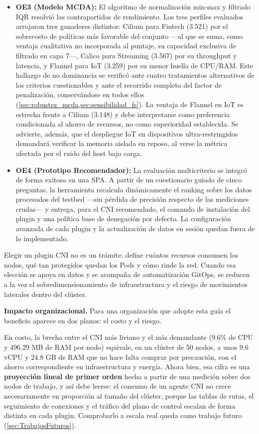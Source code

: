 \begin{itemize}
    \item \textbf{OE3 (Modelo MCDA):} El algoritmo de normalización min-max y filtrado IQR resolvió las contrapartidas de rendimiento. Los tres perfiles evaluados arrojaron tres ganadores distintos: Cilium para Fintech (3.521) por el sobrecosto de políticas más favorable del conjunto ---al que se suma, como ventaja cualitativa no incorporada al puntaje, su capacidad exclusiva de filtrado en capa 7---, Calico para Streaming (3.567) por su throughput y latencia, y Flannel para IoT (3.259) por su menor huella de CPU/RAM. Este hallazgo de no dominancia se verificó ante cuatro tratamientos alternativos de los criterios cuestionables y ante el recorrido completo del factor de penalización, conservándose en todos ellos (\cref{sec:robustez_mcda,sec:sensibilidad_fs}). La ventaja de Flannel en IoT es estrecha frente a Cilium (3.148) y debe interpretarse como preferencia condicionada al ahorro de recursos, no como superioridad establecida. Se advierte, además, que el despliegue IoT en dispositivos ultra-restringidos demandará verificar la memoria aislada en reposo, al verse la métrica afectada por el ruido del host bajo carga.
    
    \item \textbf{OE4 (Prototipo Recomendador):} La evaluación multicriterio se integró de forma exitosa en una SPA. A partir de un cuestionario guiado de cinco preguntas, la herramienta recalcula dinámicamente el ranking sobre los datos procesados del testbed ---sin pérdida de precisión respecto de las mediciones crudas--- y entrega, para el CNI recomendado, el comando de instalación del plugin y una política base de denegación por defecto. La configuración avanzada de cada plugin y la actualización de datos en sesión quedan fuera de lo implementado.
\end{itemize}

Elegir un plugin CNI no es un trámite: define cuántos recursos consumen los nodos, qué tan protegidos quedan los Pods y cómo rinde la red. Cuando esa elección se apoya en datos y se acompaña de automatización GitOps, se reducen a la vez el sobredimensionamiento de infraestructura y el riesgo de movimientos laterales dentro del clúster.

\textbf{Impacto organizacional.} Para una organización que adopte esta guía el beneficio aparece en dos planos: el costo y el riesgo.

En costo, la brecha entre el CNI más liviano y el más demandante ($9.6\%$ de CPU y $496.29$ MB de RAM por nodo) equivale, en un clúster de 50 nodos, a unos $9.6$ vCPU y $24.8$ GB de RAM que no hace falta comprar por precaución, con el ahorro correspondiente en infraestructura y energía. Ahora bien, esa cifra es una \textbf{proyección lineal de primer orden} hecha a partir de una medición sobre dos nodos de trabajo, y así debe leerse: el consumo de un agente CNI no crece necesariamente en proporción al tamaño del clúster, porque las tablas de rutas, el seguimiento de conexiones y el tráfico del plano de control escalan de forma distinta en cada plugin. Comprobarlo a escala real queda como trabajo futuro (\cref{sec:TrabajosFuturos}).

